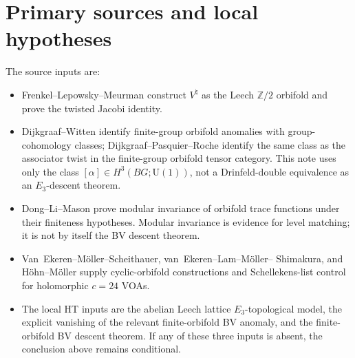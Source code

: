\documentclass[11pt]{amsart}
\theoremstyle{definition}
\theoremstyle{remark}
\providecommand{\Z}{\mathbb{Z}}
\begin{document}
\section{Primary sources and local hypotheses}

The source inputs are:
\begin{itemize}[nosep]
\item Frenkel--Lepowsky--Meurman construct $V^\natural$ as the
Leech $\Z/2$ orbifold and prove the twisted Jacobi identity.
\item Dijkgraaf--Witten identify finite-group orbifold anomalies with
group-cohomology classes; Dijkgraaf--Pasquier--Roche identify the same
class as the associator twist in the finite-group orbifold tensor
category. This note uses only the class
$[\alpha]\in H^3(BG;\mathrm{U}(1))$, not a Drinfeld-double equivalence
as an $E_3$-descent theorem.
\item Dong--Li--Mason prove modular invariance of orbifold trace
functions under their finiteness hypotheses. Modular invariance is
evidence for level matching; it is not by itself the BV descent
theorem.
\item Van~Ekeren--M\"oller--Scheithauer, van~Ekeren--Lam--M\"oller--
Shimakura, and H\"ohn--M\"oller supply cyclic-orbifold constructions
and Schellekens-list control for holomorphic $c=24$ VOAs.
\item The local HT inputs are the abelian Leech lattice
$E_3$-topological model, the explicit vanishing of the relevant
finite-orbifold BV anomaly, and the finite-orbifold BV descent
theorem. If any of these three inputs is absent, the conclusion above
remains conditional.
\end{itemize}
\end{document}
